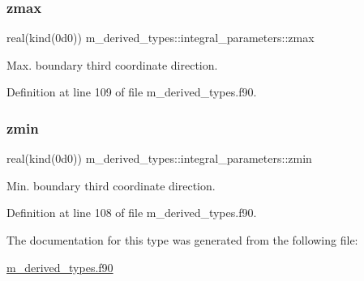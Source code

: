 \subsubsection{\texorpdfstring{zmax}{zmax}}
{\footnotesize\ttfamily real(kind(0d0)) m\+\_\+derived\+\_\+types\+::integral\+\_\+parameters\+::zmax}



Max. boundary third coordinate direction. 



Definition at line 109 of file m\+\_\+derived\+\_\+types.\+f90.

\mbox{\label{structm__derived__types_1_1integral__parameters_ac53398acc55c52cc75df02228605b80d}} 
\subsubsection{\texorpdfstring{zmin}{zmin}}
{\footnotesize\ttfamily real(kind(0d0)) m\+\_\+derived\+\_\+types\+::integral\+\_\+parameters\+::zmin}



Min. boundary third coordinate direction. 



Definition at line 108 of file m\+\_\+derived\+\_\+types.\+f90.



The documentation for this type was generated from the following file\+:\begin{DoxyCompactItemize}
\item 
\hyperlink{m__derived__types_8f90}{m\+\_\+derived\+\_\+types.\+f90}\end{DoxyCompactItemize}
